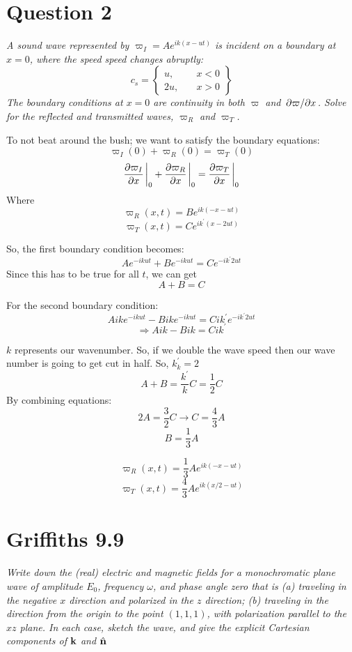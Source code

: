 \documentclass[12pt]{article}
\begin{document}
\section*{Question 2}
\emph{A sound wave represented by $\varpi_I = Ae^{ik(x-ut)}$ is incident on a boundary at $x=0$, where the speed speed changes abruptly:}
    \begin{equation}
    c_s = \left\{
        \begin{array}{ll}
            u, & \quad x < 0 \\
            2u, & \quad x > 0
        \end{array}
    \right\}
    \label{eq:c_s}
    \end{equation}
\emph{The boundary conditions at $x=0$ are continuity in both $\varpi$ and $\pdv*{\varpi}{x}$. Solve for the reflected and transmitted waves, $\varpi_R$ and $\varpi_T$.}\bigskip

To not beat around the bush; we want to satisfy the boundary equations:
\[\varpi_I(0) + \varpi_R(0) = \varpi_T(0)\]
\[\pdv{\varpi_I}{x} \eval_0 + \pdv{\varpi_R}{x}\eval_0 = \pdv{\varpi_T}{x}\eval_0\]
Where 
\[\varpi_R(x,t) = B e^{ik(-x-ut)}\]
\[\varpi_T(x,t) = C e^{ik^\prime(x-2ut)}\]
\bigskip

So, the first boundary condition becomes:
\[Ae^{-ikut} + Be^{-ikut} = Ce^{-ik^\prime 2ut}\]
Since this has to be true for all $t$, we can get
\[A+B = C\]

For the second boundary condition:
\[Aike^{-ikut} - Bike^{-ikut} = Cik^\prime e^{-ik^\prime 2ut}\]
\[\Rightarrow Aik - Bik = Cik^\prime\]
\bigskip

$k$ represents our wavenumber. So, if we double the wave speed then our wave number is going to get cut in half. So, $k_k^\prime = 2$
\[A+B = \frac{k^\prime}{k}C = \frac{1}{2}C\]
By combining equations:
\[2A = \frac{3}{2}C \longrightarrow C = \frac{4}{3}A\]
\[B = \frac{1}{3}A\]
\bigskip 

\[\boxed{\varpi_R(x,t) = \frac{1}{3}A e^{ik(-x-ut)}}\]
\[\boxed{\varpi_T(x,t) = \frac{4}{3}A e^{ik(x/2-ut)}}\]

\newpage


\section*{Griffiths 9.9}
\emph{Write down the (real) electric and magnetic fields for a monochromatic plane wave of amplitude $E_0$, frequency $\omega$, and phase angle zero that is (a) traveling in the negative $x$ direction and polarized in the $z$ direction; (b) traveling in the direction from the origin to the point $(1,1,1)$, with polarization parallel to the $xz$ plane. In each case, sketch the wave, and give the explicit Cartesian components of $\vb{k}$ and $\hat{\vb{n}}$}\bigskip
\end{document}

